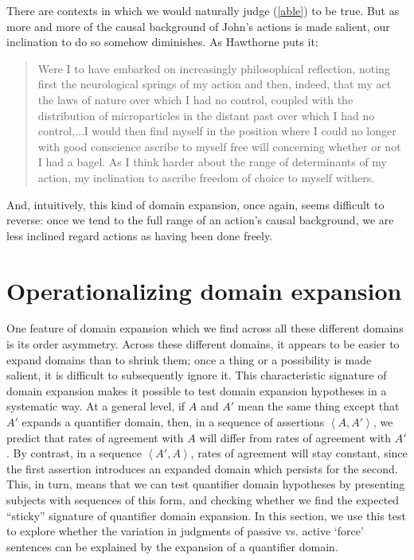 \documentclass{salt}
\newcommand{\seq}[1]{\left\langle {#1} \right\rangle}
\newcommand{\reff}[1]{(\ref{#1})}
\begin{document}
\noindent  There are contexts in which we would naturally judge \reff{able} to be true. But as more and more of the causal background of John's actions is made salient, our inclination to do so somehow diminishes. As Hawthorne puts it: \begin{quote}Were I to have embarked on increasingly philosophical reflection, noting first the neurological springs of my action and then, indeed, that my act the laws of nature over which I had no control, coupled with the distribution of microparticles in the distant past over which I had no control,$\dots$I would then find myself in the position where I could no longer with good conscience ascribe to myself free will concerning whether or not I had a bagel. As I think harder about the range of determinants of my action, my inclination to ascribe freedom of choice to myself withers.\hfill \citep[p. 66-67]{Hawthorne:2001}\end{quote}

\noindent And, intuitively, this kind of domain expansion, once again, seems difficult to reverse: once we tend to the full range of an action's causal background, we are less inclined regard actions as having been done freely. 


\section{Operationalizing domain expansion}

One feature of domain expansion which we find across all these different domains is its order asymmetry. Across these different domains, it appears to be easier to {expand} domains than to shrink them; once a thing or a possibility is made salient, it is difficult to subsequently ignore it. This characteristic signature of domain expansion makes it possible to test  domain expansion hypotheses in a systematic way. At a general level, if $A$ and $A'$ mean the same thing except that $A'$ expands a quantifier domain, then, in a sequence of assertions $\seq{A, A'}$, we predict that rates of agreement with $A$ will differ from rates of agreement with $A'$. By contrast, in a sequence $\seq{A',A}$, rates of agreement will stay constant, since the first assertion introduces an expanded domain which persists for the second. This, in turn, means that we can test quantifier domain hypotheses by presenting subjects with sequences of this form, and checking whether we find the expected ``sticky'' signature of quantifier domain expansion. In this section, we use this test to explore whether the variation in judgments of passive vs. active `force' sentences can be explained by the expansion of a quantifier domain.
\end{document}
